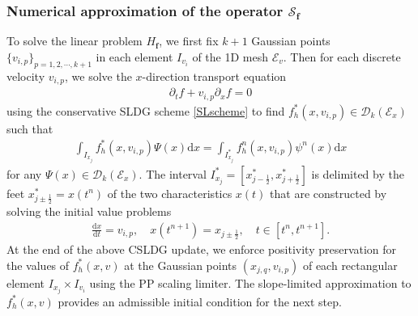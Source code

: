 \documentclass[letterpaper,10pt]{article}
\numberwithin{equation}{section}
\numberwithin{figure}{section}
\numberwithin{table}{section}
\begin{document}
\subsubsection{Numerical approximation of the operator $\mathcal{S}_{\mathbf{f}}$}
\hspace{4pt}
To solve the linear problem $H_{\mathbf{f}}$, we first fix $k+1$ Gaussian points
 $\{v_{i,p}\}_{p=1,2,\cdots,k+1}$ in each element $I_{v_i}$ of the 1D mesh $\mathcal E_v$. 
Then for each discrete velocity $v_{i,p}$, we solve the $x$-direction transport equation
\begin{align*}
    \partial_tf+v_{i,p}\partial_xf=0
\end{align*}
using the conservative SLDG scheme \eqref{SLscheme} to
find $f_h^{*}(x,v_{i,p})\in \mathcal{D}_k(\mathcal{E}_x)$ such that
\begin{align}\label{Hhf}
    \int_{I_{x_j}} f_h^{*}(x,v_{i,p}) \Psi(x)\mathrm d x
    =\int_{I_{x_j}^*} f_h^n(x,v_{i,p}) \psi^n(x)\mathrm d x
\end{align}
for any $\Psi(x) \in \mathcal{D}_k(\mathcal{E}_x)$. The interval
$I_{x_j}^*=\left[x_{j-\frac{1}{2}}^*,x_{j+\frac{1}{2}}^*\right]$ is
delimited by the feet $x_{j\pm \frac{1}{2}}^*=x(t^n)$ of the two
characteristics $x(t)$ that are constructed by solving the initial value problems
\begin{align*}
    \frac{\mathrm dx}{\mathrm dt}=v_{i,p},\quad x(t^{n+1})=x_{j\pm \frac{1}{2}},\quad t\in[t^n,t^{n+1}].
\end{align*}
At the end of the above CSLDG update, we enforce positivity preservation
for the values of $f_h^{*}(x,v)$ at the Gaussian points $(x_{j,q},v_{i,p})$
of each rectangular element $I_{x_j}\times I_{v_i}$ using the PP scaling
limiter. The slope-limited approximation to $f_h^{*}(x,v)$
provides an admissible initial condition for the next step.
\end{document}
